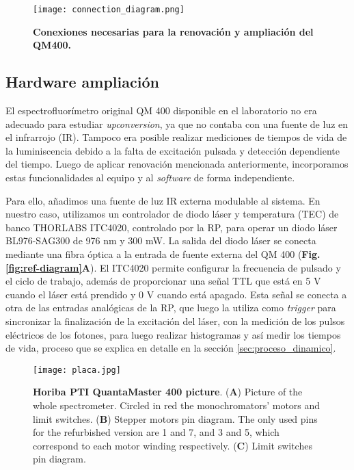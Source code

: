 \begin{figure}
     \centering
     \texttt{[image: connection\_diagram.png]}
     \caption{
    \textbf{Conexiones necesarias para la renovación y ampliación del QM400.}
    }
     \label{fig:connection_diagram}
\end{figure}



\subsection{Hardware ampliación}

El espectrofluorímetro original QM 400 disponible en el laboratorio no era adecuado para estudiar \textit{upconversion}, ya que no contaba con una fuente de luz en el infrarrojo (IR). 
Tampoco era posible realizar mediciones de tiempos de vida de la luminiscencia debido a la falta de excitación pulsada y detección dependiente del tiempo. 
Luego de aplicar renovación mencionada anteriormente, incorporamos estas funcionalidades al equipo y al \textit{software} de forma independiente.

Para ello, añadimos una fuente de luz IR externa modulable al sistema. 
En nuestro caso, utilizamos un controlador de diodo láser y temperatura (TEC) de banco THORLABS ITC4020, controlado por la RP, para operar un diodo láser BL976-SAG300 de 976 nm y 300 mW. 
La salida del diodo láser se conecta mediante una fibra óptica a la entrada de fuente externa del QM 400 (\textbf{Fig. \ref{fig:ref-diagram}A}). 
El ITC4020 permite configurar la frecuencia de pulsado y el ciclo de trabajo, además de proporcionar una señal TTL que está en 5 V cuando el láser está prendido y 0 V cuando está apagado.
Esta señal se conecta a otra de las entradas analógicas de la RP, que luego la utiliza como \textit{trigger} para sincronizar la finalización de la excitación del láser, con la medición de los pulsos eléctricos de los fotones, para luego realizar histogramas y así medir los tiempos de vida, proceso que se explica en detalle en la sección \ref{sec:proceso_dinamico}.  


\begin{figure}[h]
     \centering
     \texttt{[image: placa.jpg]}
     \caption{\textbf{Horiba PTI QuantaMaster 400 picture}.  (\textbf{A}) Picture of the whole spectrometer. Circled in red the monochromators' motors and limit switches. (\textbf{B}) Stepper motors pin diagram. The only used pins for the refurbished version are 1 and 7, and 3 and 5, which correspond to each motor winding respectively. (\textbf{C}) Limit switches pin diagram.}
     \label{fig:placa}
\end{figure}


